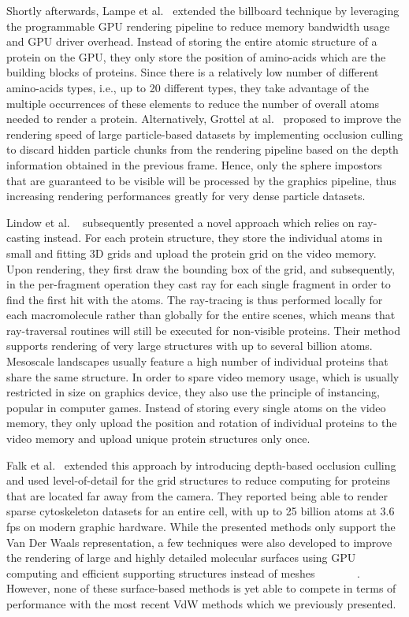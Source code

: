 Shortly afterwards, Lampe et al.~\cite{lampe2007two} extended the billboard technique by leveraging the programmable GPU rendering pipeline to reduce memory bandwidth usage and GPU driver overhead. 
Instead of storing the entire atomic structure of a protein on the GPU, they only store the position of amino-acids which are the building blocks of proteins.
Since there is a relatively low number of different amino-acids types, i.e., up to 20 different types, they take advantage of the multiple occurrences of these elements to reduce the number of overall atoms needed to render a protein.
Alternatively, Grottel at al.~\cite{grottel2010coherent} proposed to improve the rendering speed of large particle-based datasets by implementing occlusion culling to discard hidden particle chunks from the rendering pipeline based on the depth information obtained in the previous frame.
Hence, only the sphere impostors that are guaranteed to be visible will be processed by the graphics pipeline, thus increasing rendering performances greatly for very dense particle datasets.

Lindow et al. ~\cite{lindow2012interactive} subsequently presented a novel approach which relies on ray-casting instead.
For each protein structure, they store the individual atoms in small and fitting 3D grids and upload the protein grid on the video memory.
Upon rendering, they first draw the bounding box of the grid, and subsequently, in the per-fragment operation they cast ray for each single fragment in order to find the first hit with the atoms.
The ray-tracing is thus performed locally for each macromolecule rather than globally for the entire scenes, which means that ray-traversal routines will still be executed for non-visible proteins.
Their method supports rendering of very large structures with up to several billion atoms.
Mesoscale landscapes usually feature a high number of individual proteins that share the same structure.
In order to spare video memory usage, which is usually restricted in size on graphics device, they also use the principle of instancing, popular in computer games.
Instead of storing every single atoms on the video memory, they only upload the position and rotation of individual proteins to the video memory and upload unique protein structures only once.

Falk et al.~\cite{falk2013atomistic} extended this approach by introducing depth-based occlusion culling and used level-of-detail for the grid structures to reduce computing for proteins that are located far away from the camera.
They reported being able to render sparse cytoskeleton datasets for an entire cell, with up to 25 billion atoms at 3.6 fps on modern graphic hardware.
While the presented methods only support the Van Der Waals representation, a few techniques were also developed to improve the rendering of large and highly detailed molecular surfaces using GPU computing and efficient supporting structures instead of meshes ~\cite{krone2012fast}~\cite{parulek2012implicit} ~\cite{parulek2013fast} ~\cite{krone2011parallel} ~\cite{szecsi2012real}. 
However, none of these surface-based methods is yet able to compete in terms of performance with the most recent VdW methods which we previously presented.

